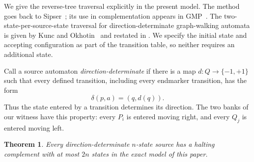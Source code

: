\documentclass[11pt,a4paper]{article}
\newtheorem{theorem}{Theorem}[section]
\theoremstyle{definition}
\theoremstyle{remark}
\begin{document}
We give the reverse-tree traversal explicitly in the present model.
The method goes back to Sipser~\cite{Sipser1980}; its use in
complementation appears in GMP~\cite{GMP}. The two-state-per-source-state
traversal for direction-determinate graph-walking automata is given
by Kunc and Okhotin~\cite{kuncokhotin2020} and restated in
\cite[Lemma~8]{martynovaokhotin2021}. We specify the initial state and accepting configuration as part of
the transition table, so neither requires an additional state.

Call a source automaton \emph{direction-determinate} if there is a map
$d:Q\to\{-1,+1\}$ such that every defined transition, including every
endmarker transition, has the form
\[
  \delta(p,a)=(q,d(q)).
\]
Thus the state entered by a transition determines its direction. The two banks
of our witness have this property: every $P_i$ is entered moving right, and
every $Q_j$ is entered moving left.

\begin{theorem}\label{thm:direction-upper}
Every direction-determinate $n$-state source has a halting complement
with at most $2n$ states in the exact model of this paper.
\end{theorem}
\end{document}
